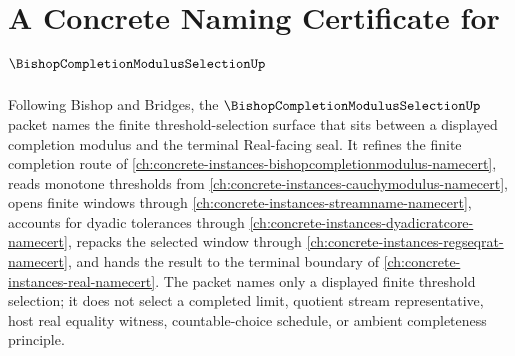 \chapter{A Concrete Naming Certificate for $\BishopCompletionModulusSelectionUp$}
\label{ch:concrete-instances-bishop-completion-modulus-selection-namecert}

Following Bishop and Bridges, the $\BishopCompletionModulusSelectionUp$ packet names the finite threshold-selection surface that sits between a displayed completion modulus and the terminal Real-facing seal. It refines the finite completion route of \autoref{ch:concrete-instances-bishopcompletionmodulus-namecert}, reads monotone thresholds from \autoref{ch:concrete-instances-cauchymodulus-namecert}, opens finite windows through \autoref{ch:concrete-instances-streamname-namecert}, accounts for dyadic tolerances through \autoref{ch:concrete-instances-dyadicratcore-namecert}, repacks the selected window through \autoref{ch:concrete-instances-regseqrat-namecert}, and hands the result to the terminal boundary of \autoref{ch:concrete-instances-real-namecert}. The packet names only a displayed finite threshold selection; it does not select a completed limit, quotient stream representative, host real equality witness, countable-choice schedule, or ambient completeness principle.

